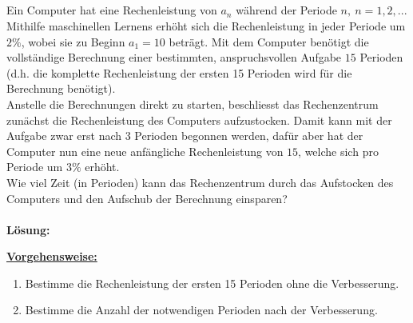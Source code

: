 \newpage
\subsection*{}
Ein Computer hat eine Rechenleistung von $ a_n $ während der Periode $ n, \ n = 1,2,... $
Mithilfe maschinellen Lernens erhöht sich die Rechenleistung in jeder Periode um $ 2 \%  $, wobei sie zu Beginn $ a_1 = 10 $ beträgt.
Mit dem Computer benötigt die vollständige Berechnung einer bestimmten, anspruchsvollen Aufgabe $ 15 $ Perioden (d.h. die komplette Rechenleistung der ersten 15 Perioden wird für die Berechnung benötigt).\\
Anstelle die Berechnungen direkt zu starten, beschliesst das Rechenzentrum  zunächst die Rechenleistung des Computers aufzustocken.
Damit kann mit der Aufgabe zwar erst nach $ 3 $ Perioden begonnen werden, dafür aber hat der Computer nun eine neue anfängliche Rechenleistung von $ 15 $, welche sich pro Periode um $ 3 \% $ erhöht.\\
Wie viel Zeit (in Perioden) kann das Rechenzentrum durch das Aufstocken des Computers und den Aufschub der Berechnung einsparen?
\\ \\
\textbf{Lösung:}
\begin{mdframed}
\underline{\textbf{Vorgehensweise:}}
\begin{enumerate}
\item Bestimme die Rechenleistung der ersten 15 Perioden ohne die Verbesserung.
\item Bestimme die Anzahl der notwendigen Perioden nach der Verbesserung.
\end{enumerate}
\end{mdframed}

